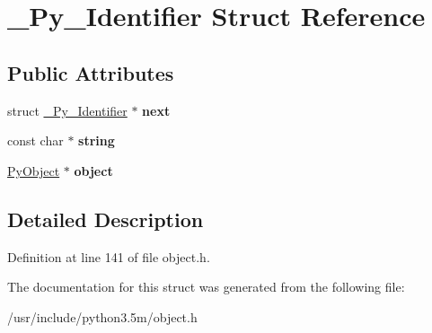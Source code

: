 \hypertarget{struct__Py__Identifier}{}\section{\+\_\+\+Py\+\_\+\+Identifier Struct Reference}
\label{struct__Py__Identifier}
\subsection*{Public Attributes}
\begin{DoxyCompactItemize}
\item 
struct \hyperlink{struct__Py__Identifier}{\+\_\+\+Py\+\_\+\+Identifier} $\ast$ {\bfseries next}\hypertarget{struct__Py__Identifier_aee911003e96fa6aec66760bad4c9e167}{}\label{struct__Py__Identifier_aee911003e96fa6aec66760bad4c9e167}

\item 
const char $\ast$ {\bfseries string}\hypertarget{struct__Py__Identifier_a8b2b8569e24ce2b60f4abfd3ad08ed86}{}\label{struct__Py__Identifier_a8b2b8569e24ce2b60f4abfd3ad08ed86}

\item 
\hyperlink{struct__object}{Py\+Object} $\ast$ {\bfseries object}\hypertarget{struct__Py__Identifier_a733f5aaca91a550458d24a2bddad8125}{}\label{struct__Py__Identifier_a733f5aaca91a550458d24a2bddad8125}

\end{DoxyCompactItemize}


\subsection{Detailed Description}


Definition at line 141 of file object.\+h.



The documentation for this struct was generated from the following file\+:\begin{DoxyCompactItemize}
\item 
/usr/include/python3.\+5m/object.\+h\end{DoxyCompactItemize}
